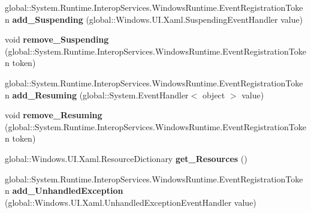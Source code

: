 \begin{DoxyCompactItemize}
\item 
\mbox{\label{interface_windows_1_1_u_i_1_1_xaml_1_1_i_application_ac0c225619b2deaf238efa786fac50afb}} 
global\+::\+System.\+Runtime.\+Interop\+Services.\+Windows\+Runtime.\+Event\+Registration\+Token {\bfseries add\+\_\+\+Suspending} (global\+::\+Windows.\+U\+I.\+Xaml.\+Suspending\+Event\+Handler value)
\item 
\mbox{\label{interface_windows_1_1_u_i_1_1_xaml_1_1_i_application_a2d065fda78dfbe6343b98c8c19648fcf}} 
void {\bfseries remove\+\_\+\+Suspending} (global\+::\+System.\+Runtime.\+Interop\+Services.\+Windows\+Runtime.\+Event\+Registration\+Token token)
\item 
\mbox{\label{interface_windows_1_1_u_i_1_1_xaml_1_1_i_application_adad8e0f1037225acc55bfcc1272edcd4}} 
global\+::\+System.\+Runtime.\+Interop\+Services.\+Windows\+Runtime.\+Event\+Registration\+Token {\bfseries add\+\_\+\+Resuming} (global\+::\+System.\+Event\+Handler$<$ object $>$ value)
\item 
\mbox{\label{interface_windows_1_1_u_i_1_1_xaml_1_1_i_application_a3388b85af6dfd9f47abf5dbfe7274acb}} 
void {\bfseries remove\+\_\+\+Resuming} (global\+::\+System.\+Runtime.\+Interop\+Services.\+Windows\+Runtime.\+Event\+Registration\+Token token)
\item 
\mbox{\label{interface_windows_1_1_u_i_1_1_xaml_1_1_i_application_af85326d17430aa8cf53216ec4beb0251}} 
global\+::\+Windows.\+U\+I.\+Xaml.\+Resource\+Dictionary {\bfseries get\+\_\+\+Resources} ()
\item 
\mbox{\label{interface_windows_1_1_u_i_1_1_xaml_1_1_i_application_ae4f5867a120030fd6bfe6cf03786a52d}} 
global\+::\+System.\+Runtime.\+Interop\+Services.\+Windows\+Runtime.\+Event\+Registration\+Token {\bfseries add\+\_\+\+Unhandled\+Exception} (global\+::\+Windows.\+U\+I.\+Xaml.\+Unhandled\+Exception\+Event\+Handler value)
\item 
\mbox{\label{interface_windows_1_1_u_i_1_1_xaml_1_1_i_application_ab5826c25b60c9dc3ea4c0dff5937ea55}} 

\end{DoxyCompactItemize}
